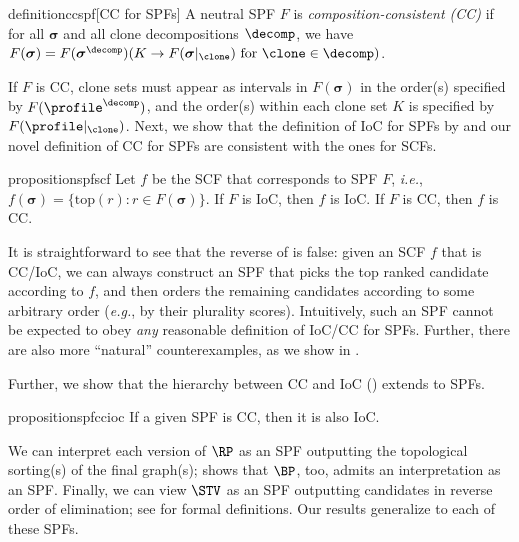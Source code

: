 \begin{restatable}{definition}{ccspf}[CC for SPFs] \label{def:cc_spf} 
A neutral SPF $F$ is \emph{composition-consistent (CC)} if for all $\boldsymbol{\sigma}$ and all clone decompositions $\decomp$, we have $F(\boldsymbol{\sigma}) = F(\boldsymbol{\sigma}^\decomp)(K \rightarrow F(\boldsymbol{\sigma}|_\clone)\text{ for }\clone \in \decomp)$.    
\end{restatable}

If $F$ is CC, clone sets must appear as intervals in $F(\boldsymbol{\sigma})$ in the order(s) specified by $F(\profile^\decomp)$, and the order(s) within each clone set $K$ is specified by $F(\profile|_\clone)$. Next, we show that the definition of IoC for SPFs by \citet{Freeman14:Axiomatic} and our novel definition of CC for SPFs are consistent with the ones for SCFs.
\begin{restatable}{proposition}{spfscf}\label{prop:SPFtoSCF}
    Let $f$ be the SCF that corresponds to SPF $F$, \emph{i.e.}, $f(\boldsymbol{\sigma})=\{\text{top}(r): r\in F(\boldsymbol{\sigma})\}$. If $F$ is IoC, then $f$ is IoC. If $F$ is CC, then $f$ is CC.
\end{restatable}

It is straightforward to see that the reverse of  is false: given an SCF $f$ that is CC/IoC, we can always construct an SPF that picks the top ranked candidate according to $f$, and then orders the remaining candidates according to some arbitrary order (\emph{e.g.}, by their plurality scores). Intuitively, such an SPF cannot be expected to obey \emph{any} reasonable definition of IoC/CC for SPFs. Further, there are also more ``natural'' counterexamples, as we show in .

Further, we show that the hierarchy between CC and IoC () extends to SPFs.

\begin{restatable}{proposition}{spfccioc}\label{prop:cctoiocspf}
    If a given SPF is CC, then it is also IoC.
\end{restatable}



We can interpret each version of $\RP$ as an SPF outputting the topological sorting(s) of the final graph(s); \citet{Schulze10:New} shows that $\BP$, too, admits an interpretation as an SPF. Finally, we can view $\STV$ as an SPF outputting candidates in reverse order of elimination; see  for formal definitions. Our results generalize to each of these SPFs.

